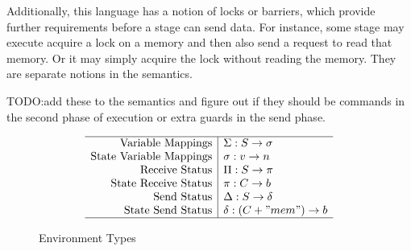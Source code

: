 \documentclass{article}
\begin{document}
Additionally, this language has a notion of locks or barriers,
which provide further requirements before a stage can send data.
For instance, some stage may execute acquire a lock
on a memory and then also send a request to read that memory.
Or it may simply acquire the lock without reading the memory.
They are separate notions in the semantics.

TODO:add these to the semantics and figure out if they should
be commands in the second phase of execution or extra guards in the send phase.

\begin{figure}
  \[\begin{array}{r|l} \hline
    \text{Variable Mappings} & \Sigma: S \rightarrow \sigma \\
    \text{State Variable Mappings} & \sigma: v \rightarrow n \\
    \text{Receive Status} & \Pi: S \rightarrow \pi \\
    \text{State Receive Status} & \pi: C \rightarrow b \\
    \text{Send Status} & \Delta: S \rightarrow \delta \\
    \text{State Send Status} & \delta: (C + "mem") \rightarrow b \\ \hline
  \end{array}\]
  \caption{Environment Types}
\end{figure}
\end{document}
